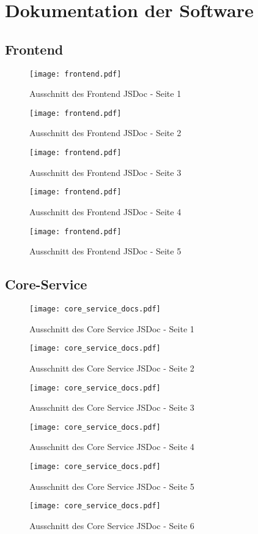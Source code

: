 \section{Dokumentation der Software}
\subsection{Frontend}
\begin{figure}[H]
    \texttt{[image: frontend.pdf]}
    \caption*{Ausschnitt des Frontend JSDoc - Seite 1}
\end{figure}
\begin{figure}[H]
    \texttt{[image: frontend.pdf]}
    \caption*{Ausschnitt des Frontend JSDoc - Seite 2}
\end{figure}
\begin{figure}[H]
    \texttt{[image: frontend.pdf]}
    \caption*{Ausschnitt des Frontend JSDoc - Seite 3}
\end{figure}
\begin{figure}[H]
    \texttt{[image: frontend.pdf]}
    \caption*{Ausschnitt des Frontend JSDoc - Seite 4}
\end{figure}
\begin{figure}[H]
    \texttt{[image: frontend.pdf]}
    \caption*{Ausschnitt des Frontend JSDoc - Seite 5}
\end{figure}

\subsection{Core-Service}
\begin{figure}[H]
    \texttt{[image: core\_service\_docs.pdf]}
    \caption*{Ausschnitt des Core Service JSDoc - Seite 1}
\end{figure}
\begin{figure}[H]
    \texttt{[image: core\_service\_docs.pdf]}
    \caption*{Ausschnitt des Core Service JSDoc - Seite 2}
\end{figure}
\begin{figure}[H]
    \texttt{[image: core\_service\_docs.pdf]}
    \caption*{Ausschnitt des Core Service JSDoc - Seite 3}
\end{figure}
\begin{figure}[H]
    \texttt{[image: core\_service\_docs.pdf]}
    \caption*{Ausschnitt des Core Service JSDoc - Seite 4}
\end{figure}
\begin{figure}[H]
    \texttt{[image: core\_service\_docs.pdf]}
    \caption*{Ausschnitt des Core Service JSDoc - Seite 5}
\end{figure}
\begin{figure}[H]
    \texttt{[image: core\_service\_docs.pdf]}
    \caption*{Ausschnitt des Core Service JSDoc - Seite 6}
\end{figure}

